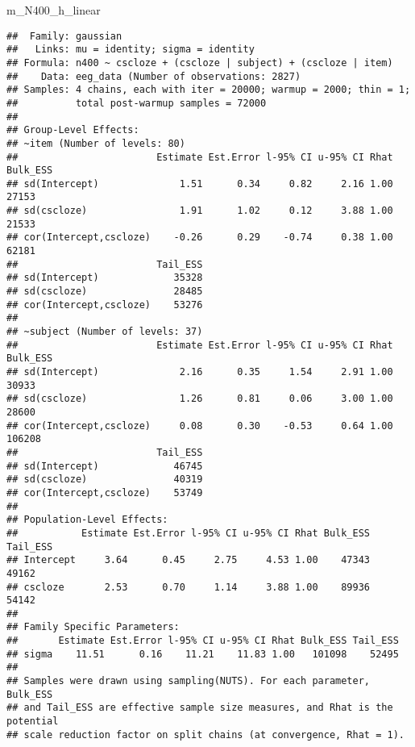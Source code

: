 \documentclass[12pt,ignorenonframetext,aspectratio=169]{beamer}
\newenvironment{Shaded}{\begin{snugshade}}{\end{snugshade}}
\newcommand{\NormalTok}[1]{#1}
\begin{document}
\begin{frame}[fragile]

\tiny

\begin{Shaded}
\begin{Highlighting}[]
\NormalTok{m_N400_h_linear}
\end{Highlighting}
\end{Shaded}

\begin{verbatim}
##  Family: gaussian 
##   Links: mu = identity; sigma = identity 
## Formula: n400 ~ cscloze + (cscloze | subject) + (cscloze | item) 
##    Data: eeg_data (Number of observations: 2827) 
## Samples: 4 chains, each with iter = 20000; warmup = 2000; thin = 1;
##          total post-warmup samples = 72000
## 
## Group-Level Effects: 
## ~item (Number of levels: 80) 
##                        Estimate Est.Error l-95% CI u-95% CI Rhat Bulk_ESS
## sd(Intercept)              1.51      0.34     0.82     2.16 1.00    27153
## sd(cscloze)                1.91      1.02     0.12     3.88 1.00    21533
## cor(Intercept,cscloze)    -0.26      0.29    -0.74     0.38 1.00    62181
##                        Tail_ESS
## sd(Intercept)             35328
## sd(cscloze)               28485
## cor(Intercept,cscloze)    53276
## 
## ~subject (Number of levels: 37) 
##                        Estimate Est.Error l-95% CI u-95% CI Rhat Bulk_ESS
## sd(Intercept)              2.16      0.35     1.54     2.91 1.00    30933
## sd(cscloze)                1.26      0.81     0.06     3.00 1.00    28600
## cor(Intercept,cscloze)     0.08      0.30    -0.53     0.64 1.00   106208
##                        Tail_ESS
## sd(Intercept)             46745
## sd(cscloze)               40319
## cor(Intercept,cscloze)    53749
## 
## Population-Level Effects: 
##           Estimate Est.Error l-95% CI u-95% CI Rhat Bulk_ESS Tail_ESS
## Intercept     3.64      0.45     2.75     4.53 1.00    47343    49162
## cscloze       2.53      0.70     1.14     3.88 1.00    89936    54142
## 
## Family Specific Parameters: 
##       Estimate Est.Error l-95% CI u-95% CI Rhat Bulk_ESS Tail_ESS
## sigma    11.51      0.16    11.21    11.83 1.00   101098    52495
## 
## Samples were drawn using sampling(NUTS). For each parameter, Bulk_ESS
## and Tail_ESS are effective sample size measures, and Rhat is the potential
## scale reduction factor on split chains (at convergence, Rhat = 1).
\end{verbatim}

\end{frame}
\end{document}
